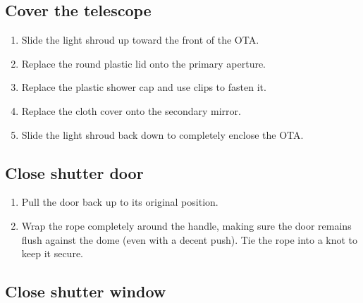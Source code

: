 \documentclass{article}
\begin{document}
	\subsection{Cover the telescope}
		
		\begin{enumerate}
				
			\item Slide the light shroud up toward the front of the OTA.
			
			\item Replace the round plastic lid onto the primary aperture.
			
			\item Replace the plastic shower cap and use clips to fasten it.
			
			\item Replace the cloth cover onto the secondary mirror.
			
			\item Slide the light shroud back down to completely enclose the OTA.
			
		\end{enumerate}
		
	\subsection{Close shutter door}
		
		\begin{enumerate}
			
			\item Pull the door back up to its original position.
			
			\item Wrap the rope completely around the handle, making sure the door remains flush against the dome (even with a decent push). Tie the rope into a knot to keep it secure.
			
		\end{enumerate}
		
	\subsection{Close shutter window}
		
\end{document}
